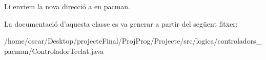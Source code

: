 Li enviem la nova direcció a en pacman. 

La documentació d'aquesta classe es va generar a partir del següent fitxer\+:\begin{DoxyCompactItemize}
\item 
/home/oscar/\+Desktop/projecte\+Final/\+Proj\+Prog/\+Projecte/src/logica/controladors\+\_\+pacman/Controlador\+Teclat.\+java\end{DoxyCompactItemize}

